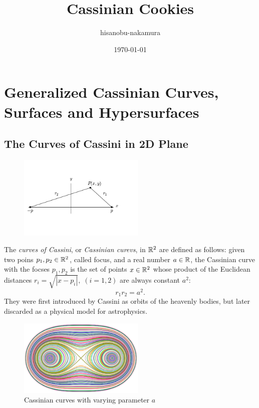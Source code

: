 \documentclass{article}
\author{hisanobu-nakamura}
\date{\today}
\title{Cassinian Cookies}
\begin{document}
\maketitle
\tableofcontents


\section{Generalized Cassinian Curves, Surfaces and Hypersurfaces}
\label{sec-1}
\subsection{The Curves of Cassini in 2D Plane}
\label{sec-1-1}
\begin{figure}[h]
\begin{center}
\includegraphics[width=6cm]{images/cassini_generic_point.png}
\caption{}
\label{ }
\end{center}
\end{figure}
The \emph{curves of Cassini}, or \emph{Cassinian curevs}, in $\mathbb R^2$ are defined as follows: given two poins $p_1, p_2 \in \mathbb R^2$, called focus, and a real number $a \in \mathbb R$, 
the Cassinian curve with the focses $p_{1},p_{2}$ is the set of points $x \in \mathbb R^2$ whose product of the Euclidean distances $r_i = \sqrt{|x-p_i|}, \; (i=1,2)$ are always constant $a^2$:
\begin{equation}
\label{ }
r_1 r_2 = a^2.
\end{equation}
They were first introduced by Cassini as orbits of the heavenly bodies, but later discarded as a physical model for astrophysics.
\begin{figure}[h]
\begin{center}
\includegraphics[width=6cm]{images/cassini2.eps}
\caption{Cassinian curves with varying parameter $a$}
\label{ }
\end{center}
\end{figure}
\end{document}

